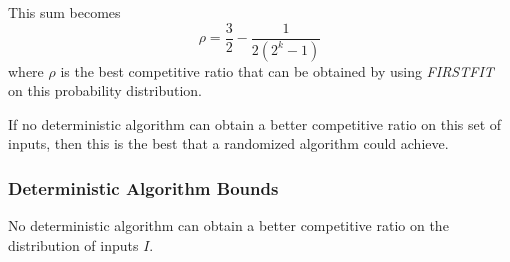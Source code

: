 This sum becomes
\begin{equation*}
\rho = \frac{3}{2} - \frac{1}{2(2^k-1)}
\end{equation*}
%
where $\rho$ is the best competitive ratio that can be obtained by using \emph{FIRSTFIT} on this probability distribution.

If no deterministic algorithm can obtain a better competitive ratio on this set of inputs, then this is the best that a randomized algorithm could achieve.
\subsubsection{Deterministic Algorithm Bounds}
\begin{theorem}
	No deterministic algorithm can obtain a better competitive ratio on the distribution of inputs $I$.
\end{theorem}
